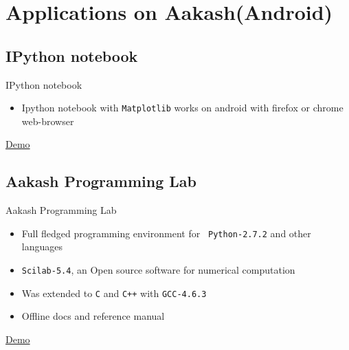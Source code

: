 \documentclass{beamer}
\begin{document}
\section{Applications on Aakash(Android)}
  \subsection{IPython notebook}
  \begin{frame}{IPython notebook}
    \begin{itemize}
    \item Ipython notebook with {\tt Matplotlib} works on android
      with firefox or chrome web-browser 
      \pause
    \end{itemize}
    \begin{block}{}
      \centerline{\href{file:///home/sachin/Videos/fossin/final.AVI}{Demo}}
    \end{block}
  \end{frame}
  
  \subsection{Aakash Programming Lab}
  \begin{frame}{Aakash Programming Lab}
    \begin{itemize}
      \item Full fledged programming environment for {\tt
        Python-2.7.2} and other languages
      \item {\tt Scilab-5.4}, an Open source software for numerical
        computation
      \item Was extended to {\tt C} and {\tt C++} with {\tt GCC-4.6.3}
      \item Offline docs and reference manual 
        \pause
    \end{itemize}
    \begin{block}{}
      \centerline{\href{file:///home/sachin/Videos/fossin/final.AVI}{Demo}}
    \end{block}
  \end{frame}
\end{document}

